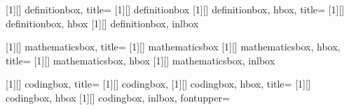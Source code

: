 [1][]{
    definitionbox,
    title=
}
[1][]{
    definitionbox
}
[1][]{
    definitionbox,
    hbox,
    title=
    }
[1][]{
    definitionbox,
    hbox
}
\newtcbox{\inldefbox}[1][]{
    definitionbox,
    inlbox
}

[1][]{
    mathematicsbox,
    title=
}
[1][]{
    mathematicsbox
}
[1][]{
    mathematicsbox,
    hbox,
    title=
    }
[1][]{
    mathematicsbox,
    hbox
}
\newtcbox{\inlmathbox}[1][]{
    mathematicsbox,
    inlbox
}

[1][]{
    codingbox,
    title=
}
[1][]{
    codingbox,
}
[1][]{
    codingbox,
    hbox,
    title=
    }
[1][]{
    codingbox,
    hbox
}
\newtcbox{\inlcodebox}[1][]{
    codingbox,
    inlbox,
    fontupper=\ttfamily
}

\newcommand\defc[1]{{\color{\MainColor}#1}}

\usepackage{parskip} %
\usepackage[toc,sort=use]{glossaries}